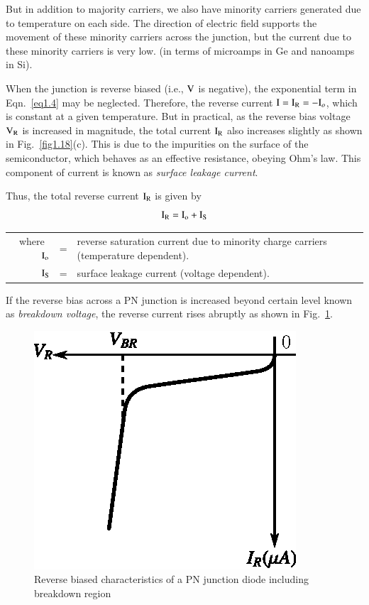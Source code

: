 But in addition to majority carriers, we also have minority carriers generated due to temperature on each side. The direction of electric field supports the movement of these minority carriers across the junction, but the current due to these minority carriers is very low. (in terms of microamps in Ge and nanoamps in Si).

When the junction is reverse biased (i.e., $\textrm{V}$ is negative), the exponential term in Eqn.~\ref{eq1.4} may be neglected. Therefore, the reverse current $\textrm{I}=\textrm{I}_{\textrm{R}}=-\textrm{I}_{o}$, which is constant at a given temperature. But in practical, as the reverse bias voltage $\textrm{V}_{\textrm{R}}$ is increased in magnitude, the total current $\textrm{I}_{\textrm{R}}$ also increases slightly as shown in Fig.~\ref{fig1.18}(c). This is due to the impurities on the surface of the semiconductor, which behaves as an effective resistance, obeying Ohm's law. This component of current is known as {\em surface leakage current}.

Thus, the total reverse current $\textrm{I}_{\textrm{R}}$ is given by
\begin{equation}
\textrm{I}_{\textrm{R}}=\textrm{I}_{\textrm{o}}+\textrm{I}_{\textrm{S}}\label{eq1.5}
\end{equation}

\noindent
\begin{tabular}{@{}r@{\;\,}c@{\;\,}p{9cm}}
where~ $\textrm{I}_{\textrm{o}}$ & = & reverse saturation current due to minority charge carriers (temperature dependent).\\[3pt]
      $\textrm{I}_{\textrm{S}}$ & = & surface leakage current (voltage dependent). 
\end{tabular}

\smallskip
{} If the reverse bias across a PN junction is increased beyond certain level known as {\em breakdown voltage}, the reverse current rises abruptly as shown in Fig.~\ref{fig1.19}.
\begin{figure}[H]
\centering
\includegraphics{chap1/fig1.19.eps}
\caption{Reverse biased characteristics of a PN junction diode including breakdown region}\label{fig1.19}
\end{figure}

